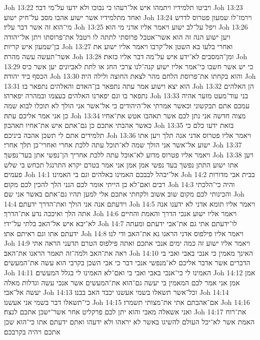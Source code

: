 Joh 13:22  ויביטו תלמידיו ויתמהו איש אל־רעהו כי נבוכו ולא ידעו על־מי דבר׃
Joh 13:23  ואחד מתלמידיו אשר ישוע אהבו מסב על־חיק ישוע׃
Joh 13:24  וירמז־לו שמעון פטרוס לדרש מי־הוא זה אשר דבר עליו׃
Joh 13:25  ויפל על־לב ישוע ויאמר אליו אדני מי הוא׃
Joh 13:26  ויען ישוע הנה זה הוא אשר־אטבל פרוסתי לתתה לו ויטבל את־פרוסתו ויתן אל־יהודה בן־שמעון איש קריות׃
Joh 13:27  ואחרי בלעו בא השטן אל־קרבו ויאמר אליו ישוע את אשר־תעשה עשה מהרה׃
Joh 13:28  ומן־המסבים לא־ידע איש על־מה דבר אליו כזאת׃
Joh 13:29  כי יש אשר חשבו כי־אמר אליו ישוע קנה־לנו צרכי החג או לתת לאביונים יען אשר כיס הכסף ביד יהודה׃
Joh 13:30  והוא בקחתו את־פרוסת הלחם מהר לצאת החוצה ולילה היה׃
Joh 13:31  הוא יצא וישוע אמר עתה נתפאר בן־האדם והאלהים נתפאר בו׃
Joh 13:32  הן האלהים נתפאר בו וגם יפארנו האלהים בעצמו ובמהרה יפארהו׃
Joh 13:33  בני עוד־מעט מזער אהיה עמכם אתם תבקשוני וכאשר אמרתי אל־היהודים כי אל־אשר אני הולך לא תוכלו לבוא שמה כן אני אמר אליכם עתה׃
Joh 13:34  מצוה חדשה אני נתן לכם אשר תאהבו אטש את־אחיו כאשר אהבתי אתכם כן גם־אתם איש את־אחיו תאהבון׃
Joh 13:35  בזאת ידעו כלם כי תלמידים אתם לי תשכן אהבה ביניכם׃
Joh 13:36  ויאמר אליו פטרוס אדני אנה תלך ויען אתו ישוע אל־אשר אני הולך שמה לא־תוכל עתה ללכת אחרי ואחרי־כן תלך אחרי׃
Joh 13:37  ויאמר אליו פטרוס מדוע לא־אוכל עתה ללכת אחריך הן־נפשי אתן בעד־נפשך׃
Joh 13:38  ויען אתו ישוע התתן נפשך בעד נפשי אמן אמן אני אמר בטרם יקרא התרנגל תכחש בי שלש פעמים׃
Joh 14:1  אל־יבהל לבבכם האמינו באלהים וגם בי האמינו׃
Joh 14:2  בבית אבי מדורות רבים ואם־לא כן הייתי אומר לכם הנני הלך להכין לכם מקום׃
Joh 14:3  והיה כי־הלכתי והכינותי לכם מקום שוב אשוב ולקחתי אתכם אלי למען תהיו גם־אתם באשר אני שם׃
Joh 14:4  וידעתם אנה אני הולך ואת־הדרך ידעתם׃
Joh 14:5  ויאמר אליו תומא אדני לא ידענו אנה אתה הלך ואיככה נדע את־הדרך׃
Joh 14:6  ויאמר אליו ישוע אנכי הדרך והאמת והחיים לא־יבא איש אל־האב בלתי על־ידי׃
Joh 14:7  לו־ידעתם אתי גם את־אבי ידעתם ומעתה ידעתם אתו וגם ראיתם אתו׃
Joh 14:8  ויאמר אליו פילפוס אדני הראנו נא את־האב ודי לנו׃
Joh 14:9  ויאמר אליו ישוע זה כמה ימים אנכי אתכם ואתה פילפוס הטרם תדעני הראה אתי ראה את־האב ולמה־זה תאמר הראנו את־האב׃
Joh 14:10  האינך מאמין כי אנכי באבי ואבי בי הדברים אשר אדבר אליכם לא־מנפשי אנכי דבר כי אבי השכן בקרבי הוא עשה את־המעשים׃
Joh 14:11  האמינו לי כי־אנכי באבי ואבי בי ואם־לא האמינו לי בגלל המעשים׃
Joh 14:12  אמן אמן אני אמר לכם המאמין בי יעשה גם־הוא את־המעשים אשר אנכי עשה וגדלות מאלה יעשה אל־אבי׃
Joh 14:13  וכל־אשר תשאלו בשמי אעשנו יכבד האב בבנו׃
Joh 14:14  כי־תשאלו דבר בשמי אני אעשנו׃
Joh 14:15  אם־אהבתם אתי את־מצותי תשמרו׃
Joh 14:16  ואני אשאלה מאבי והוא יתן לכם פרקליט אחר אשר־ישכן אתכם לנצח׃
Joh 14:17  את־רוח האמת אשר לא־יכל העולם להשיגו באשר לא יראהו ולא ידעהו ואתם ידעתם אתו כי־הוא שכן אתכם ויהיה בקרבכם׃
